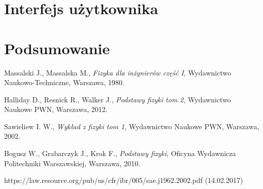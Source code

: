 \documentclass[12pt]{article} %
\numberwithin{equation}{subsection}
\numberwithin{figure}{section}
\numberwithin{table}{section}
\begin{document}
	\newpage
	
	
\section{Interfejs użytkownika}
	\hspace{0.5cm}
	
	\newpage
	
\section{Podsumowanie}
	
	\hspace{0.5cm} 
	
	\newpage	
	
\begin{thebibliography}{99}

		Massalski J., Massalska M., \emph{Fizyka dla inżynierów część I}, Wydawnictwo Naukowo-Techniczne, Warszawa, 1980.
	
		Halliday D., Resnick R., Walker J., \emph{Podstawy fizyki tom 2}, Wydawnictwo Naukowe PWN, Warszawa, 2012.

		Sawieliew I. W., \emph{Wykład z fizyki tom 1}, Wydawnictwo Naukowe PWN, Warszawa, 2002.
	
		Bogusz W., Grabarczyk J., Krok F., \emph{Podstawy fizyki}, Oficyna Wydawnicza Politechniki Warszawskiej, Warszawa, 2010.
		
		https://law.resource.org/pub/us/cfr/ibr/005/sae.j1962.2002.pdf (14.02.2017)
		

\end{thebibliography}
	\newpage

	\listoffigures{}
	\newpage

	\listoftables
	\newpage
\end{document}
